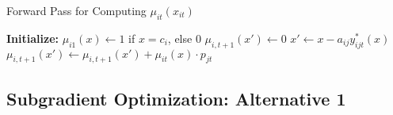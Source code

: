 \documentclass[11pt]{article}
\begin{document}
{\begin{algorithm}[H]
\caption{Forward Pass for Computing $\mu_{it}(x_{it})$}
\begin{algorithmic}[1]
    \State \textbf{Initialize:} $\mu_{i1}(x) \gets 1$ if $x = c_i$, else $0$ 
         
            \State $\mu_{i, t+1}(x') \gets 0$
        \EndFor
         
                \State $x' \gets x - a_{ij} y_{ijt}^*(x)$
                 
                    \State $\mu_{i, t+1}(x') \gets \mu_{i, t+1}(x') + \mu_{it}(x) \cdot p_{jt}$
                \EndIf
            \EndFor
        \EndFor
    \EndFor
\end{algorithmic}
\end{algorithm}

\vspace{0.5cm}




\subsection{Subgradient Optimization: Alternative 1}




}
\end{document}

